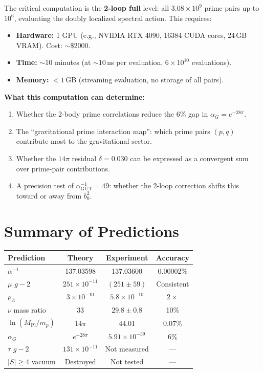 \documentclass[aps,prd,twocolumn,superscriptaddress,nofootinbib]{revtex4-2}
\begin{document}
The critical computation is the \textbf{2-loop full} level: all
$3.08\times 10^9$ prime pairs up to $10^6$, evaluating the doubly
localized spectral action.  This requires:
\begin{itemize}
\item \textbf{Hardware:} 1 GPU (e.g., NVIDIA RTX 4090, 16384 CUDA
cores, 24\,GB VRAM).  Cost: $\sim$\$2000.
\item \textbf{Time:} $\sim$10 minutes (at $\sim 10$\,ns per
evaluation, $6\times 10^{10}$ evaluations).
\item \textbf{Memory:} $<1$\,GB (streaming evaluation, no storage
of all pairs).
\end{itemize}

\noindent\textbf{What this computation can determine:}
\begin{enumerate}
\item Whether the 2-body prime correlations reduce the $6\%$ gap in
$\alpha_G=e^{-28\pi}$.
\item The ``gravitational prime interaction map'': which prime pairs
$(p,q)$ contribute most to the gravitational sector.
\item Whether the $14\pi$ residual $\delta=0.030$ can be expressed
as a convergent sum over prime-pair contributions.
\item A precision test of $\alpha_{\mathrm{GUT}}^{-1}=49$: whether
the 2-loop correction shifts this toward or away from $b_0^2$.
\end{enumerate}

\section{Summary of Predictions}\label{sec:summary}

\begin{center}
\begin{tabular}{lccc}
\toprule
Prediction & Theory & Experiment & Accuracy \\
\midrule
$\alpha^{-1}$ & 137.03598 & 137.03600 & 0.00002\% \\
$\mu$ $g{-}2$ & $251\times 10^{-11}$ & $(251\pm 59)$ & Consistent \\
$\rho_\Lambda$ & $3\times 10^{-10}$ & $5.8\times 10^{-10}$ & $2\times$ \\
$\nu$ mass ratio & 33 & $29.8\pm 0.8$ & 10\% \\
$\ln(M_{\mathrm{Pl}}/m_p)$ & $14\pi$ & 44.01 & 0.07\% \\
$\alpha_G$ & $e^{-28\pi}$ & $5.91\times 10^{-39}$ & 6\% \\
$\tau$ $g{-}2$ & $131\times 10^{-11}$ & Not measured & --- \\
$|S|\geq 4$ vacuum & Destroyed & Not tested & --- \\
\bottomrule
\end{tabular}
\end{center}
\end{document}
